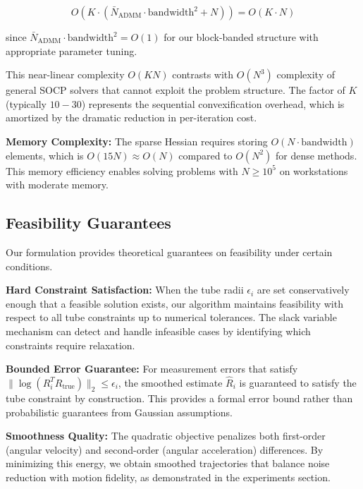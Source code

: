 \begin{equation}
O(K \cdot (\bar{N}_{\text{ADMM}} \cdot \text{bandwidth}^2 + N)) = O(K \cdot N)
\end{equation}

since $\bar{N}_{\text{ADMM}} \cdot \text{bandwidth}^2 = O(1)$ for our block-banded structure with appropriate parameter tuning.

This near-linear complexity $O(KN)$ contrasts with $O(N^3)$ complexity of general SOCP solvers that cannot exploit the problem structure. The factor of $K$ (typically $10-30$) represents the sequential convexification overhead, which is amortized by the dramatic reduction in per-iteration cost.

\textbf{Memory Complexity:} The sparse Hessian requires storing $O(N \cdot \text{bandwidth})$ elements, which is $O(15N) \approx O(N)$ compared to $O(N^2)$ for dense methods. This memory efficiency enables solving problems with $N \geq 10^5$ on workstations with moderate memory.

\subsection{Feasibility Guarantees}

Our formulation provides theoretical guarantees on feasibility under certain conditions.

\textbf{Hard Constraint Satisfaction:} When the tube radii $\epsilon_i$ are set conservatively enough that a feasible solution exists, our algorithm maintains feasibility with respect to all tube constraints up to numerical tolerances. The slack variable mechanism can detect and handle infeasible cases by identifying which constraints require relaxation.

\textbf{Bounded Error Guarantee:} For measurement errors that satisfy $\| \log(R_i^T R_{\text{true}}) \|_2 \leq \epsilon_i$, the smoothed estimate $\hat{R}_i$ is guaranteed to satisfy the tube constraint by construction. This provides a formal error bound rather than probabilistic guarantees from Gaussian assumptions.

\textbf{Smoothness Quality:} The quadratic objective penalizes both first-order (angular velocity) and second-order (angular acceleration) differences. By minimizing this energy, we obtain smoothed trajectories that balance noise reduction with motion fidelity, as demonstrated in the experiments section.
